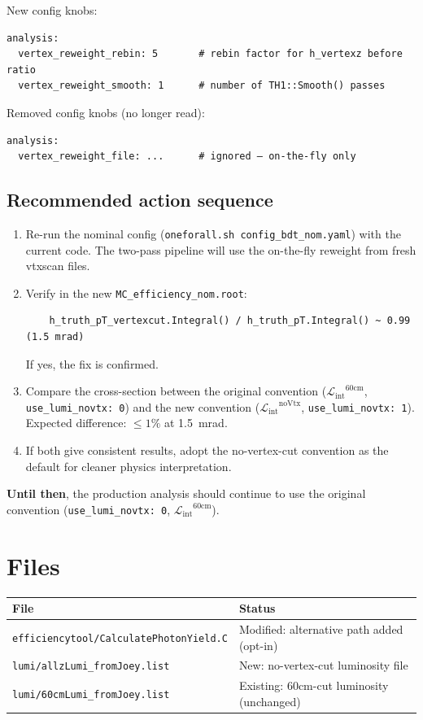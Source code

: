 \documentclass[11pt,letterpaper]{article}
\newcommand{\Lint}{\ensuremath{\mathcal{L}_{\text{int}}}}
\begin{document}
New config knobs:
\begin{verbatim}
analysis:
  vertex_reweight_rebin: 5       # rebin factor for h_vertexz before ratio
  vertex_reweight_smooth: 1      # number of TH1::Smooth() passes
\end{verbatim}

Removed config knobs (no longer read):
\begin{verbatim}
analysis:
  vertex_reweight_file: ...      # ignored — on-the-fly only
\end{verbatim}

\subsection{Recommended action sequence}

\begin{enumerate}
  \item Re-run the nominal config (\texttt{oneforall.sh
    config\_bdt\_nom.yaml}) with the current code. The two-pass
    pipeline will use the on-the-fly reweight from fresh vtxscan
    files.
  \item Verify in the new \texttt{MC\_efficiency\_nom.root}:
    \begin{verbatim}
    h_truth_pT_vertexcut.Integral() / h_truth_pT.Integral() ~ 0.99 (1.5 mrad)
    \end{verbatim}
    If yes, the fix is confirmed.
  \item Compare the cross-section between the original convention
    ($\Lint^{60\text{cm}}$, \texttt{use\_lumi\_novtx: 0}) and the new
    convention ($\Lint^{\text{noVtx}}$, \texttt{use\_lumi\_novtx: 1}).
    Expected difference: $\leq 1\%$ at 1.5~mrad.
  \item If both give consistent results, adopt the no-vertex-cut
    convention as the default for cleaner physics interpretation.
\end{enumerate}

\textbf{Until then}, the production analysis should continue to use
the original convention (\texttt{use\_lumi\_novtx: 0},
$\Lint^{60\text{cm}}$).

\section{Files}
\label{sec:files}

\begin{tabular}{ll}
\toprule
\textbf{File} & \textbf{Status} \\
\midrule
\texttt{efficiencytool/CalculatePhotonYield.C} & Modified: alternative path added (opt-in) \\
\texttt{lumi/allzLumi\_fromJoey.list} & New: no-vertex-cut luminosity file \\
\texttt{lumi/60cmLumi\_fromJoey.list} & Existing: 60cm-cut luminosity (unchanged) \\
\bottomrule
\end{tabular}
\end{document}
